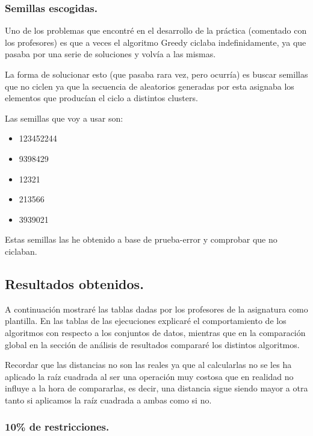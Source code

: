 \documentclass[12pt, spanish]{article}
\begin{document}
\subsubsection{Semillas escogidas.}

Uno de los problemas que encontré en el desarrollo de la práctica (comentado con los profesores) es que a veces el algoritmo Greedy ciclaba indefinidamente, ya que pasaba por una serie de soluciones y volvía a las mismas.

La forma de solucionar esto (que pasaba rara vez, pero ocurría) es buscar semillas que no ciclen ya que la secuencia de aleatorios generadas por esta asignaba los elementos que producían el ciclo a distintos clusters.

Las semillas que voy a usar son:

\begin{itemize}
	\item {123452244}
	\item {9398429}
	\item {12321}
	\item {213566}
	\item {3939021}
\end{itemize}

Estas semillas las he obtenido a base de prueba-error y comprobar que no ciclaban.

\newpage

\subsection{Resultados obtenidos.}

A continuación mostraré las tablas dadas por los profesores de la asignatura como plantilla. En las tablas de las ejecuciones explicaré el comportamiento de los algoritmos con respecto a los conjuntos de datos, mientras que en la comparación global en la sección de análisis de resultados compararé los distintos algoritmos.

Recordar que las distancias no son las reales ya que al calcularlas no se les ha aplicado la raíz cuadrada al ser una operación muy costosa que en realidad no influye a la hora de compararlas, es decir, una distancia sigue siendo mayor a otra tanto si aplicamos la raíz cuadrada a ambas como si no.

\subsubsection{10\% de restricciones.}
\end{document}
